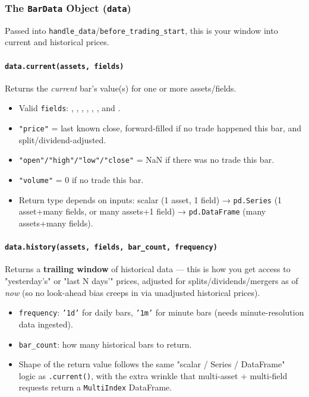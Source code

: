 \documentclass[12pt,openany]{book}
\theoremstyle{definition}
\theoremstyle{remark}
\begin{document}
\subsubsection{The \texttt{BarData} Object (\texttt{data})}

Passed into \texttt{handle\_data}/\texttt{before\_trading\_start}, this is your window into current and historical prices.

\paragraph{\texttt{data.current(assets, fields)}}

Returns the \emph{current} bar's value(s) for one or more assets/fields.

\begin{itemize}
\item 
Valid \texttt{fields}: , , , ,
, , and .

\item 
\texttt{"price"} = last known close, forward-filled if no trade happened this bar, and split/dividend-adjusted.

\item 
\texttt{"open"/"high"/"low"/"close"} = NaN if there was no trade this bar.

\item 
\texttt{"volume"} = 0 if no trade this bar.

\item 
Return type depends on inputs: scalar (1 asset, 1 field) → \texttt{pd.Series} (1 asset+many fields, or many assets+1 field) → \texttt{pd.DataFrame} (many assets+many fields).

\end{itemize}

\paragraph{\texttt{data.history(assets, fields, bar\_count, frequency)}}

Returns a \textbf{trailing window} of historical data — this is how you get access to "yesterday's" or "last N days'" prices, adjusted for splits/dividends/mergers as of \emph{now} (so no look-ahead bias creeps in via unadjusted historical prices).

\begin{itemize}
\item 
\texttt{frequency}: \texttt{'1d'} for daily bars, \texttt{'1m'} for minute bars (needs minute-resolution data ingested).

\item 
\texttt{bar\_count}: how many historical bars to return.

\item 
Shape of the return value follows the same "scalar / Series / DataFrame" logic as \texttt{.current()}, with the extra wrinkle that multi-asset + multi-field requests return a \texttt{MultiIndex} DataFrame.

\end{itemize}
\end{document}

